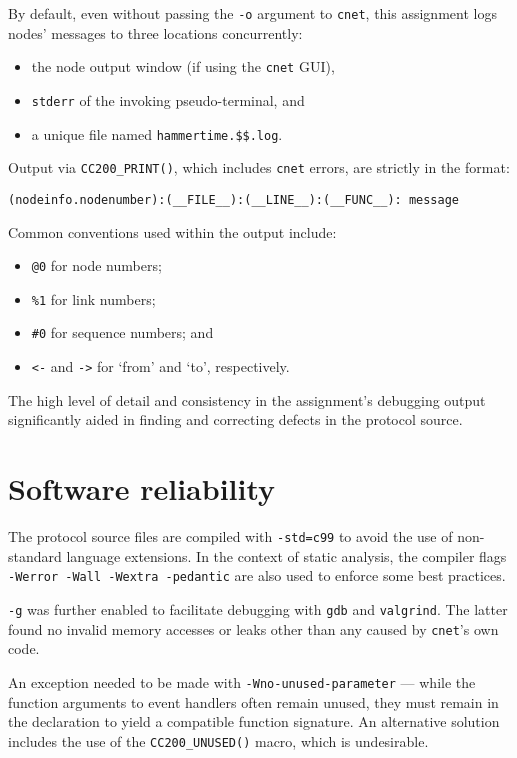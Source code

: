\documentclass[a4paper,12pt,titlepage]{article}
\begin{document}
By default, even without passing the \texttt{-o} argument to \texttt{cnet},
this assignment logs nodes' messages to three locations concurrently:

\begin{itemize}
	\item the node output window (if using the \texttt{cnet} GUI),
	\item \texttt{stderr} of the invoking pseudo-terminal, and
	\item a unique file named \texttt{hammertime.\$\$.log}.
\end{itemize}

Output via \texttt{CC200\_PRINT()}, which includes \texttt{cnet} errors, are
strictly in the format:

\begin{lstlisting}
(nodeinfo.nodenumber):(__FILE__):(__LINE__):(__FUNC__): message
\end{lstlisting}

Common conventions used within the output include:

\begin{itemize}
	\item \texttt{@0} for node numbers;
	\item \texttt{\%1} for link numbers;
	\item \texttt{\#0} for sequence numbers; and
	\item \texttt{<-} and \texttt{->} for `from' and `to', respectively.
\end{itemize}

The high level of detail and consistency in the assignment's debugging output
significantly aided in finding and correcting defects in the protocol source.

\section{Software reliability}

The protocol source files are compiled with \texttt{-std=c99} to avoid the use
of non-standard language extensions. In the context of static analysis, the
compiler flags \texttt{-Werror -Wall -Wextra -pedantic} are also used to
enforce some best practices.

\texttt{-g} was further enabled to facilitate debugging with \texttt{gdb} and
\texttt{valgrind}. The latter found no invalid memory accesses or leaks other
than any caused by \texttt{cnet}'s own code.

An exception needed to be made with \texttt{-Wno-unused-parameter} --- while
the function arguments to event handlers often remain unused, they must remain
in the declaration to yield a compatible function signature. An alternative
solution includes the use of the \texttt{CC200\_UNUSED()} macro, which is
undesirable.
\end{document}
